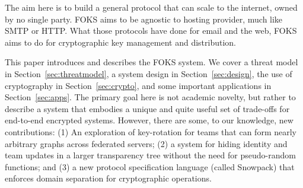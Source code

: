 The aim here is to build a general protocol that can scale to the internet, 
owned by no single party. FOKS aims to be agnostic to hosting provider, much
like SMTP or HTTP. What those protocols have done for email and the web, FOKS
aims to do for cryptographic key management and distribution.

This paper introduces and describes the FOKS system. We cover a threat model
in Section~\ref{sec:threatmodel}, a system design in Section~\ref{sec:design}, 
the use of cryptography in Section~\ref{sec:crypto}, and some important applications
in Section~\ref{sec:apps}. The primary goal here is not academic novelty, but
rather to describe a system that embodies a unique
and quite useful set of trade-offs for end-to-end encrypted systems.
However, there are some, to our knowledge, new contributions:
%
(1) An exploration of key-rotation for teams that can form
      nearly arbitrary graphs across federated servers;
%
(2) a system for hiding identity and team updates in a larger
      transparency tree without the need
      for pseudo-random functions; and
%
(3) a new protocol specification language (called Snowpack) that enforces
  domain separation for cryptographic operations.

